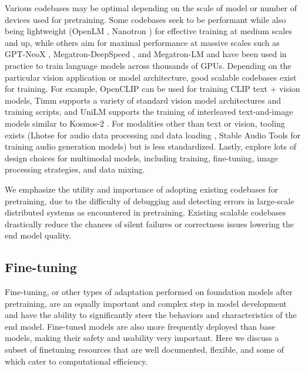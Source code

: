 Various codebases may be optimal depending on the scale of model or number of devices used for pretraining. Some codebases seek to be performant while also being lightweight (OpenLM \citep{open_lm}, Nanotron \citep{nanotron}) for effective training at medium scales and up, while others aim for maximal performance at massive scales such as GPT-NeoX \citep{gpt-neox-library}, Megatron-DeepSpeed \citep{smith2022using}, and Megatron-LM \citep{shoeybi2020megatronlm} and have been used in practice to train language models across thousands of GPUs. Depending on the particular vision application or model architecture, good scalable codebases exist for training. For example, OpenCLIP \citep{ilharco_gabriel_2021_5143773} can be used for training CLIP text + vision models, Timm \citep{ rw2019timm} supports a variety of standard vision model architectures and training scripts, and UniLM supports the training of interleaved text-and-image models similar to Kosmos-2 \citep{peng2023kosmos2}. For modalities other than text or vision, tooling exists (Lhotse for audio data processing and data loading \citep{lhotse}, Stable Audio Tools \citep{stable-audio-tools} for training audio generation models) but is less standardized.
Lastly, \citet{karamcheti2024prismatic, mckinzie2024mm1} explore lots of design choices for multimodal models, including training, fine-tuning, image processing strategies, and data mixing.

We emphasize the utility and importance of adopting existing codebases for pretraining, due to the difficulty of debugging and detecting errors in large-scale distributed systems as encountered in pretraining. Existing scalable codebases drastically reduce the chances of silent failures or correctness issues lowering the end model quality.

\subsection{Fine-tuning}
\label{sec:finetune-repo}

Fine-tuning, or other types of adaptation performed on foundation models after pretraining, are an equally important and complex step in model development and have the ability to significantly steer the behaviors and characteristics of the end model. Fine-tuned models are also more frequently deployed than base models, making their safety and usability very important. Here we discuss a subset of finetuning resources that are well documented, flexible, and some of which cater to computational efficiency.

